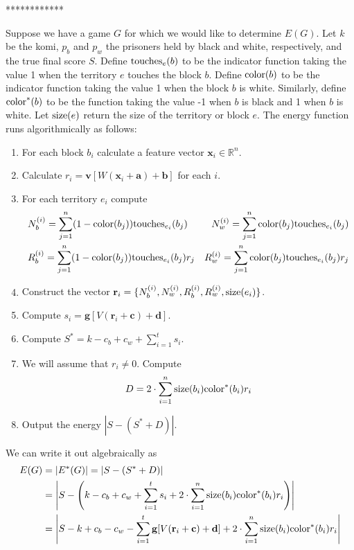 \documentclass{amsart}
\def\v#1{\mathbf{#1}}
\begin{document}
************

Suppose we have a game $G$ for which we would like to determine $E(G)$. Let $k$ be the komi, $p_b$ and $p_w$ the prisoners
held by black and white, respectively, and the true final score $S$. Define $\mbox{touches}_{ e }{\left( b \right)}$ to be the indicator function
taking the value 1 when the territory $e$ touches the block $b$. Define $\mbox{color}{\left( b \right)}$ to be the indicator function taking the
value 1 when the block $b$ is white. Similarly, define $\mbox{color}^*{\left( b \right)}$ to be the function taking the value -1 when $b$ is black and
1 when $b$ is white. Let $\mbox{size}{\left( e \right)}$ return the size of the territory or block $e$. The energy function runs algorithmically as follows:
\begin{enumerate}
  \item For each block $b_i$ calculate a feature vector $\v{ x }_i \in \mathbb{ R }^n$.
  \item Calculate $r_i = \v{ v } [W(\v{ x }_i + \v{ a }) + \v{ b }]$ for each $i$.
  \item For each territory $e_i$ compute
    \begin{align*}
      &N_b^{ (i) } = \sum_{ j = 1 }^n (1 - \mbox{color}{\left( b_j \right)}) \mbox{touches}_{ e_i }{\left( b_j \right)}
      &N_w^{ (i) } = \sum_{ j = 1 }^n \mbox{color}{\left( b_j \right)} \mbox{touches}_{ e_i }{\left( b_j \right)}\\
      &R_b^{ (i) } = \sum_{ j = 1 }^n (1 - \mbox{color}{\left( b_j \right)}) \mbox{touches}_{ e_i }{\left( b_j \right)} r_j
      &R_w^{ (i) } = \sum_{ j = 1 }^n \mbox{color}{\left( b_j \right)} \mbox{touches}_{ e_i }{\left( b_j \right)} r_j
    \end{align*}
  \item Construct the vector $\v{ r }_i = \{ N_b^{ (i) }, N_w^{ (i) }, R_b^{ (i) }, R_w^{ (i) }, \size{ e_i } \}$.
  \item Compute $s_i = \v{ g } [V(\v{ r }_i + \v{ c }) + \v{ d }]$.
  \item Compute $S^* = k - c_b + c_w + \sum_{ i = 1 }^t s_i$.
  \item We will assume that $r_i \neq 0$. Compute
    $$D = 2 \cdot \sum_{ i = 1 }^n \mbox{size}{\left( b_i \right)} \mbox{color}^*{\left( b_i \right)} r_i$$
  \item Output the energy $|S - (S^* + D)|$.
\end{enumerate}
We can write it out algebraically as
\begin{align*}
E(G) &= |E^*(G)| = |S - (S^* + D)|\\
  &= \left|S - \left(k - c_b + c_w + \sum_{ i = 1 }^t s_i
  + 2 \cdot \sum_{ i = 1 }^n \size{ b_i } \colorp{ b_i } r_i\right)\right|\\
  &= \left|S - k + c_b - c_w - \sum_{ i = 1 }^t \v{ g }[V(\v{ r }_i + \v{ c }) + \v{ d }]
  + 2 \cdot \sum_{ i = 1 }^n \size{ b_i } \colorp{ b_i } r_i\right|
\end{align*}
\end{document}
